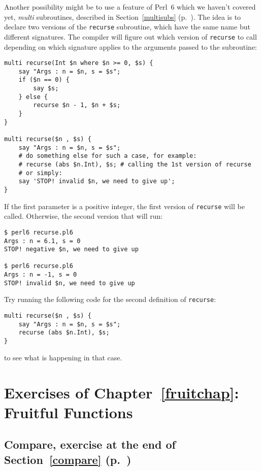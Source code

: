 Another possibility might be to use a feature of Perl~6 which 
we haven't covered yet, \emph{multi} subroutines, described in 
Section~\ref{multisubs} (p.~\pageref{multisubs}). The idea is 
to declare two versions of the {\tt recurse} subroutine, 
which have the same name but different signatures. 
The compiler will figure out which version of {\tt recurse} 
to call depending on which signature applies to the 
arguments passed to the subroutine:

\begin{verbatim}
multi recurse(Int $n where $n >= 0, $s) {
    say "Args : n = $n, s = $s";
    if ($n == 0) {
        say $s;
    } else {
        recurse $n - 1, $n + $s;
    }
}

multi recurse($n , $s) {
    say "Args : n = $n, s = $s";
    # do something else for such a case, for example:
    # recurse (abs $n.Int), $s; # calling the 1st version of recurse
    # or simply:
    say 'STOP! invalid $n, we need to give up';
}
\end{verbatim}

If the first parameter is a positive integer, the 
first version of {\tt recurse} will be called. 
Otherwise, the second version that will run:

\begin{verbatim}
$ perl6 recurse.pl6
Args : n = 6.1, s = 0
STOP! negative $n, we need to give up

$ perl6 recurse.pl6
Args : n = -1, s = 0
STOP! invalid $n, we need to give up
\end{verbatim}
%

Try running the following code for the second 
definition of {\tt recurse}:

\begin{verbatim}
multi recurse($n , $s) {
    say "Args : n = $n, s = $s";
    recurse (abs $n.Int), $s;
}
\end{verbatim}
%
to see what is happening in that case.

\section{Exercises of Chapter~\ref{fruitchap}: Fruitful Functions}

\subsection{Compare, exercise at the end of Section~\ref{compare} (p.~\pageref{compare})}
\label{sol_compare}

